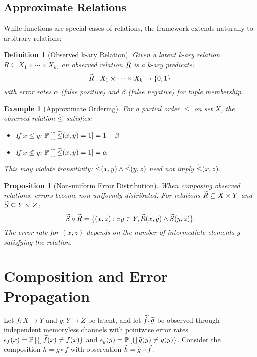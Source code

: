 \documentclass[11pt,final,hidelinks]{article}
\newtheorem{proposition}[theorem]{Proposition}
\newtheorem{definition}[theorem]{Definition}
\newtheorem{example}[theorem]{Example}
\newcommand{\error}{\epsilon}
\begin{document}
\subsection{Approximate Relations}

While functions are special cases of relations, the framework extends naturally to arbitrary relations:

\begin{definition}[Observed k-ary Relation]
Given a latent k-ary relation $R \subseteq X_1 \times \cdots \times X_k$, an observed relation $\widetilde{R}$ is a k-ary predicate:
\begin{equation}
\widetilde{R}: X_1 \times \cdots \times X_k \to \{0,1\}
\end{equation}
with error rates $\alpha$ (false positive) and $\beta$ (false negative) for tuple membership.
\end{definition}

\begin{example}[Approximate Ordering]
For a partial order $\leq$ on set $X$, the observed relation $\widetilde{\leq}$ satisfies:
\begin{itemize}
    \item If $x \leq y$: $\mathbb{P}\left[[\right]\widetilde{\leq}(x,y) = 1] = 1 - \beta$
    \item If $x \not\leq y$: $\mathbb{P}\left[[\right]\widetilde{\leq}(x,y) = 1] = \alpha$
\end{itemize}
This may violate transitivity: $\widetilde{\leq}(x,y) \land \widetilde{\leq}(y,z)$ need not imply $\widetilde{\leq}(x,z)$.
\end{example}

\begin{proposition}[Non-uniform Error Distribution]
When composing observed relations, errors become non-uniformly distributed. For relations $\widetilde{R} \subseteq X \times Y$ and $\widetilde{S} \subseteq Y \times Z$:
\begin{equation}
\widetilde{S} \circ \widetilde{R} = \{(x,z) : \exists y \in Y, \widetilde{R}(x,y) \land \widetilde{S}(y,z)\}
\end{equation}
The error rate for $(x,z)$ depends on the number of intermediate elements $y$ satisfying the relation.
\end{proposition}

\section{Composition and Error Propagation}

Let $f:X\to Y$ and $g:Y\to Z$ be latent, and let $\widetilde{f},\widetilde{g}$ be observed through independent memoryless channels with pointwise error rates $\error_f(x)=\Prob\{\obs{f}(x)\neq f(x)\}$ and $\error_g(y)=\Prob\{\obs{g}(y)\neq g(y)\}$. Consider the composition $h=g\circ f$ with observation $\widetilde{h}=\widetilde{g}\circ\widetilde{f}$.
\end{document}
